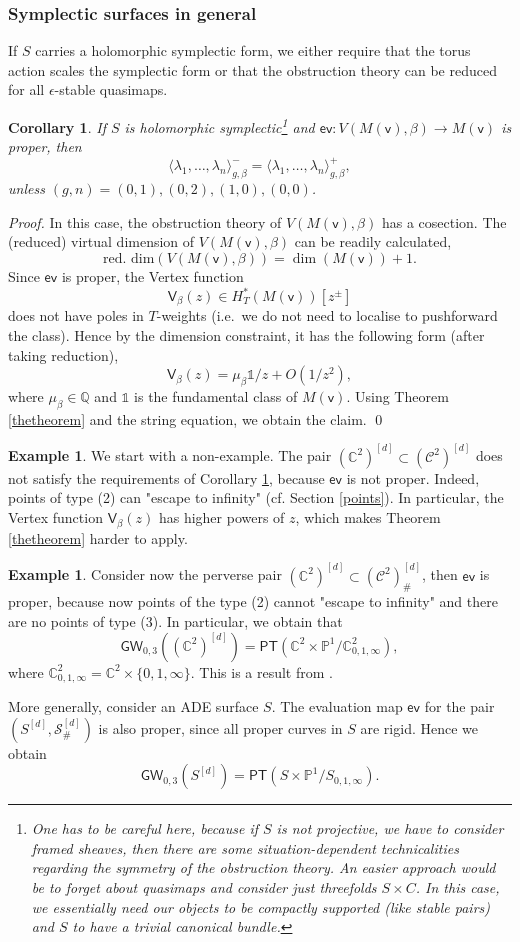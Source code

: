 \documentclass[11pt, reqno]{amsart}
\theoremstyle{plain}
\newtheorem{cor}[thm]{Corollary}
\theoremstyle{definition}
\newtheorem{example}[thm]{Example}
\theoremstyle{remark}
\newcommand{\BC}{{\mathbb{C}}}
\newcommand{\BQ}{{\mathbb{Q}}}
\newcommand{\CC}{{\mathcal C}}
\newcommand{\CS}{{\mathcal S}}
\newcommand{\vsf}{{\mathsf{v}}}
\newcommand{\p}{\mathbb{P}}
\newcommand{\evsf}{{\mathsf{ev}}}
\begin{document}
\subsubsection{Symplectic surfaces in general}
If $S$ carries a holomorphic symplectic form, we either require that the torus action scales the symplectic form or that the obstruction theory can be reduced for all $\epsilon$-stable quasimaps. 
\begin{cor} \label{important}If $S$ is holomorphic symplectic\footnote{One has to be careful here, because if $S$ is not projective, we have to consider framed sheaves, then there are some situation-dependent technicalities \cite{Sala} regarding the symmetry of the obstruction theory. An easier approach would be to forget about quasimaps and consider just threefolds $S\times C$. In this case, we essentially need our objects to be compactly supported (like stable pairs) and $S$ to have a trivial canonical bundle.} and $\evsf \colon V(M(\vsf), \beta) \rightarrow M(\vsf)$ is proper, then 
	\[\langle \lambda_1 , \dots,\lambda_n  \rangle^{-}_{g,\beta} = \langle \lambda_1, \dots,\lambda_n \rangle^{+}_{g,\beta},\] 
	unless $(g,n)=(0,1), (0,2), (1,0),(0,0)$. 
	\end{cor}
\textit{Proof.} In this case, the obstruction theory of $V(M(\vsf), \beta)$ has a cosection. The (reduced) virtual dimension of $V(M(\vsf), \beta)$ can be readily calculated, 
\[\text{red. dim}(V(M(\vsf), \beta))= \dim(M(\vsf))+1.\]
Since $\evsf$ is proper, the Vertex function
\[ \mathsf{V}_\beta(z) \in H_T^*(M(\vsf))[z^\pm]   \]
does not have poles in $T$-weights (i.e.\ we do not need to localise to pushforward the class). Hence by the dimension constraint, it has the following form (after taking reduction),
\[ \mathsf{V}_\beta(z)= \mu_\beta \mathbb 1/z+O(1/z^2), \]
where $\mu_\beta \in \BQ$ and $\mathbb 1$ is the fundamental class of $M(\vsf)$. Using  Theorem \ref{thetheorem} and the string equation, we obtain the claim. 
\qed
\begin{example} We start with a non-example. The pair $(\BC^2)^{[d]} \subset (\CC^2)^{[d]}$  does not satisfy the requirements of Corollary \ref{important}, because $\evsf$  is not proper. Indeed,  points of type (2) can "escape to infinity" (cf. Section \ref{points}).  In particular, the Vertex function $\mathsf{V}_\beta(z)$ has higher powers of $z$, which makes Theorem \ref{thetheorem} harder to apply. 
	\end{example}
\begin{example}  Consider now the perverse pair $(\BC^2)^{[d]} \subset (\CC^2)^{[d]}_\#$, then $\evsf$ is proper, because now points of the type (2) cannot "escape to infinity" and there are no points of type (3). In particular, we obtain that 
	\[ \mathsf{GW}_{0,3}((\BC^2)^{[d]})= \mathsf{PT}(\BC^2\times \p^1/ \BC^2_{0,1,\infty} ),\] 
	where $\BC^2_{0,1,\infty}=\BC^2\times\{0,1,\infty\}$. This is a result from \cite[Theorem 6]{OP10}. 
	
	More generally, consider an ADE surface $S$. The evaluation map $\evsf$ for the pair $(S^{[d]} ,\CS_{\#}^{[d]})$  is also proper, since all proper curves in $S$ are rigid. Hence we obtain 
	\[ \mathsf{GW}_{0,3}(S^{[d]})= \mathsf{PT}(S\times \p^1/ S_{0,1,\infty}).\] 
	\end{example}
\end{document}
